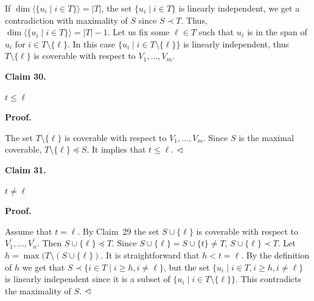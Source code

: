 \documentclass[10pt,a4paper]{article}
\begin{document}
If $\dim\langle\{u_{i}\mid i\in T\}\rangle=|T|$, the set $\{u_{i}\mid i\in T\}$ is linearly independent, we get a contradiction with maximality of $S$ since $S\prec T$. Thus, $\dim\langle\{u_{i}\mid i\in T\}\rangle=|T|-1$. Let us fix some $\ell\in T$ such that $u_{\ell}$ is in the span of $u_{i}$ for $i\in T\setminus\{\ell\}$. In this case $\{u_{i}\mid i\in T\setminus\{\ell\}\}$ is linearly independent, thus $T\setminus\{\ell\}$ is coverable with respect to $V_{1},\dots,V_{m}$.\par



\par\medskip\noindent\textbf{
Claim 30. 
}\par



$t\leq\ell$\par



\par\medskip\noindent\textbf{
Proof.}\par


The set $T\setminus\{\ell\}$ is coverable with respect to $V_{1},\dots,V_{m}$. Since $S$ is the maximal coverable, $T\setminus\{\ell\}\preceq S$. It implies that $t\leq\ell$.
$\hfill\vartriangleleft$\par



\par\medskip\noindent\textbf{
Claim 31. 
}\par



$t\neq\ell$\par



\par\medskip\noindent\textbf{
Proof.}\par


Assume that $t=\ell$. By Claim 29 the set $S\cup\{\ell\}$ is coverable with respect to $V_{1}^{\prime},\dots,V_{n}^{\prime}$. Then $S\cup\{\ell\}\preceq T$.
Since $S\cup\{\ell\}=S\cup\{t\}\neq T$, $S\cup\{\ell\}\prec T$.
Let $h=\max(T\setminus(S\cup\{\ell\})$. It is straightforward that $h<t=\ell$.
By the definition of $h$ we get that $S\prec\{i\in T\mid i\geq h,i\neq\ell\}$, but the set $\{u_{i}\mid i\in T,i\geq h,i\neq\ell\}$ is linearly independent since it is a subset of $\{u_{i}\mid i\in T\setminus\{\ell\}\}$. This contradicts the maximality of $S$.
$\hfill\vartriangleleft$\par
\end{document}

